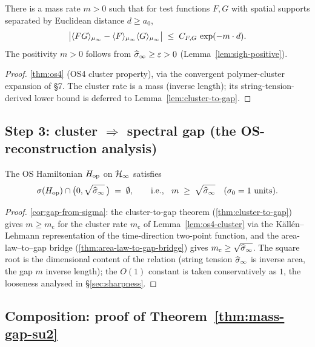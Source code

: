 \begin{lemma}
\label{lem:os4-cluster}
There is a mass rate $m > 0$ such that for test functions $F, G$ with
spatial supports separated by Euclidean distance $d \ge a_0$,
\[
  \bigl| \langle F G \rangle_{\mu_\infty} - \langle F \rangle_{\mu_\infty}
                                          \langle G \rangle_{\mu_\infty} \bigr|
  \;\le\;
  C_{F, G} \, \exp(-m \cdot d).
\]
The positivity $m > 0$ follows from $\widehat{\sigma}_\infty \ge \varepsilon > 0$
(Lemma~\ref{lem:sigh-positive}).
\end{lemma}

\begin{proof}
 \cref{thm:os4} (OS4 cluster property), via the
convergent polymer-cluster expansion of 
\S7.  The cluster rate is a mass (inverse length); its
string-tension-derived lower bound is deferred to
Lemma~\ref{lem:cluster-to-gap}.
\end{proof}

\subsection{Step 3: cluster $\Rightarrow$ spectral gap (the OS-reconstruction analysis)}

\begin{lemma}
\label{lem:cluster-to-gap}
The OS Hamiltonian $H_{\mathrm{op}}$ on $\mathcal{H}_\infty$ satisfies
\[
  \sigma(H_{\mathrm{op}}) \cap \bigl(0, \sqrt{\widehat{\sigma}_\infty}\,\bigr) \;=\; \emptyset,
  \qquad \text{i.e., } \;\; m \;\ge\; \sqrt{\widehat{\sigma}_\infty}
  \quad (\sigma_0 = 1 \text{ units}).
\]
\end{lemma}

\begin{proof}
 \cref{cor:gap-from-sigma}: the
cluster-to-gap theorem (\cref{thm:cluster-to-gap}) gives
$m \ge m_{\mathrm c}$ for the cluster rate $m_{\mathrm c}$ of
Lemma~\ref{lem:os4-cluster} via the Källén--Lehmann representation of
the time-direction two-point function, and the area-law--to--gap
bridge (\cref{thm:area-law-to-gap-bridge}) gives
$m_{\mathrm c} \ge \sqrt{\widehat{\sigma}_\infty}$.  The square root is the
dimensional content of the relation (string tension $\widehat{\sigma}_\infty$ is
inverse area, the gap $m$ inverse length); the $O(1)$ constant is
taken conservatively as $1$, the looseness analysed in
\S\ref{sec:sharpness}.
\end{proof}

\subsection{Composition: proof of Theorem~\ref{thm:mass-gap-su2}}

